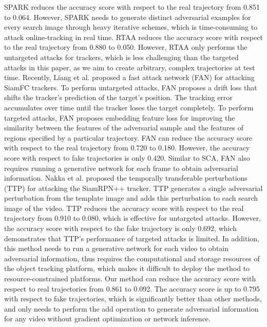 \documentclass[journal]{IEEEtran}
\begin{document}
SPARK \cite{SPARK} reduces the accuracy score with respect to the real trajectory from 0.851 to 0.064. However, SPARK needs to generate distinct adversarial examples for every search image through heavy iterative schemes, which is time-consuming to attack online-tracking in real time.
RTAA \cite{RTAA} reduces the accuracy score with respect to the real trajectory from 0.880 to 0.050. However, RTAA only performs the untargeted attacks for trackers, which is less challenging than the targeted attacks in this paper, as we aim to create arbitrary, complex trajectories at test time. 
Recently, Liang et al. proposed a fast attack network (FAN) \cite{FAN} for attacking SiamFC trackers. To perform untargeted attacks, FAN proposes a drift loss that shifts the tracker's prediction of the target's position. The tracking error accumulates over time until the tracker loses the target completely. To perform targeted attacks, FAN proposes embedding feature loss for improving the similarity between the features of the adversarial sample and the features of regions specified by a particular trajectory. FAN can reduce the accuracy score with respect to the real trajectory from 0.720 to 0.180. However, the accuracy score with respect to fake trajectories is only 0.420. Similar to SCA, FAN also requires running a generative network for each frame to obtain adversarial information. Nakka et al. \cite{TTP} proposed the temporally transferable perturbations (TTP) for attacking the SiamRPN++ tracker. TTP generates a single adversarial perturbation from the template image and adds this perturbation to each search image of the video. TTP reduces the accuracy score with respect to the real trajectory from 0.910 to 0.080, which is effective for untargeted attacks. However, the accuracy score with respect to the fake trajectory is only 0.692, which demonstrates that TTP's performance of targeted attacks is limited. In addition, this method needs to run a generative network for each video to obtain adversarial information, thus requires the computational and storage resources of the object tracking platform, which makes it difficult to deploy the method to resource-constrained platforms. Our method can reduce the accuracy score with respect to real trajectories from 0.861 to 0.092. The accuracy score is up to 0.795 with respect to fake trajectories, which is significantly better than other methods, and only needs to perform the add operation to generate adversarial information for any video without gradient optimization or network inference.
\end{document}
